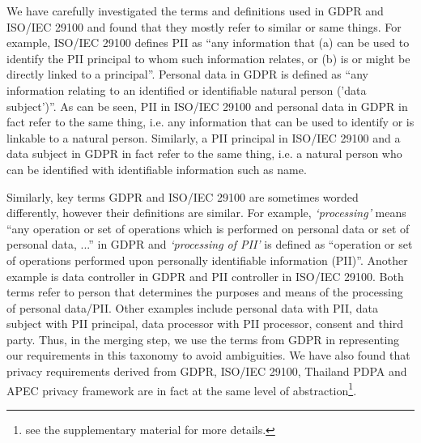 We have carefully investigated the terms and definitions used in GDPR and ISO/IEC 29100 and found that they mostly refer to similar or same things. For example, ISO/IEC 29100 defines PII as ``any information that (a) can be used to identify the PII principal to whom such information relates, or (b) is or might be directly linked to a principal''. Personal data in GDPR is defined as ``any information relating to an identified or identifiable natural person ('data subject')''. As can be seen, PII in ISO/IEC 29100 and personal data in GDPR in fact refer to the same thing, i.e. any information that can be used to identify or is linkable to a natural person. Similarly, a PII principal in ISO/IEC 29100 and a data subject in GDPR in fact refer to the same thing, i.e. a natural person who can be identified with identifiable information such as name.

Similarly, key terms GDPR and ISO/IEC 29100 are sometimes worded differently, however their definitions are similar. For example, \textit{`processing'} means ``any operation or set of operations which is performed on personal data or set of personal data, ...'' in GDPR and \textit{`processing of PII'} is defined as ``operation or set of operations performed upon personally identifiable information (PII)''. Another example is data controller in GDPR and PII controller in ISO/IEC 29100. Both terms refer to person that determines the purposes and means of the processing of personal data/PII. Other examples include personal data with PII, data subject with PII principal, data processor with PII processor, consent and third party. Thus, in the merging step, we use the terms from GDPR in representing our requirements in this taxonomy to avoid ambiguities. We have also found that privacy requirements derived from GDPR, ISO/IEC 29100, Thailand PDPA and APEC privacy framework are in fact at the same level of abstraction\footnote{see the supplementary material for more details.}.


